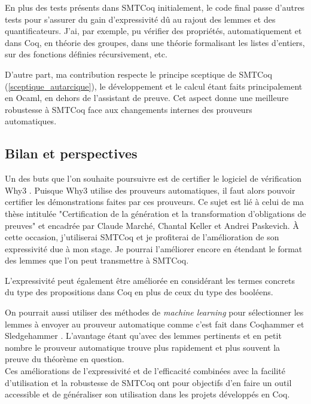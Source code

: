 \documentclass[11pt]{article}
\begin{document}
En plus des tests présents dans SMTCoq initialement, le code final passe d'autres tests pour s'assurer du gain d'expressivité dû au rajout des lemmes et des quantificateurs. J'ai, par exemple, pu vérifier des propriétés, automatiquement et dans Coq, en théorie des groupes, dans une théorie formalisant les listes d'entiers, sur des fonctions définies récursivement, etc.

D'autre part, ma contribution respecte le principe sceptique de SMTCoq (\ref{sceptique_autarcique}), le développement et le calcul étant faits principalement en Ocaml, en dehors de l'assistant de preuve. Cet aspect donne une meilleure robustesse à SMTCoq face aux changements internes des prouveurs automatiques.


\subsection{Bilan et perspectives}\label{persp}

Un des buts que l'on souhaite poursuivre est de certifier le logiciel de vérification Why3 \cite{why3_intro}. Puisque Why3 utilise des prouveurs automatiques, il faut alors pouvoir certifier les démonstrations faites par ces prouveurs. Ce sujet est lié à celui de ma thèse intitulée "Certification de la génération et la transformation d'obligations de preuves" et encadrée par Claude Marché, Chantal Keller et Andrei Paskevich. À cette occasion, j'utiliserai SMTCoq et je profiterai de l'amélioration de son expressivité due à mon stage. Je pourrai l'améliorer encore en étendant le format des lemmes que l'on peut transmettre à SMTCoq.

L'expressivité peut également être améliorée en considérant les termes concrets du type des propositions dans Coq en plus de ceux du type des booléens.

On pourrait aussi utiliser des méthodes de \textit{machine learning} pour sélectionner les lemmes à envoyer au prouveur automatique comme c'est fait dans Coqhammer et Sledgehammer \cite{hol_selector, coqhammer}. L'avantage étant qu'avec des lemmes pertinents et en petit nombre le prouveur automatique trouve plus rapidement et plus souvent la preuve du théorème en question.\\

Ces améliorations de l'expressivité et de l'efficacité combinées avec la facilité d'utilisation et la robustesse de SMTCoq ont pour objectifs d'en faire un outil accessible et de généraliser son utilisation dans les projets développés en Coq.
\end{document}
